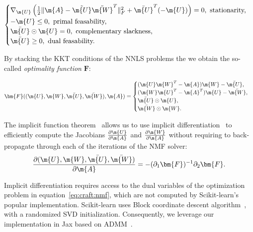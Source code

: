 \begin{equation} %
    \begin{cases}
    \nabla_{\m{U}}\left(\frac{1}{2}\|\m{A}-\tilde{\m{U}} \tilde{\m{W}}^T\|^2_F+\bar{\m{U}}^T(-\m{U})\right)    =0, \text{ stationarity,}\\
    -\m{U}\leq 0, \text{ primal feasability,}\\
    \bar{\m{U}} \odot \m{U}   =0, \text{ complementary slackness,}\\
    \bar{\m{U}}   \geq 0, \text{ dual feasability.}\\
\end{cases}
\label{apeq:craft:optimality_fun}
\end{equation}

By stacking the KKT conditions of the NNLS problems the we obtain the so-called \textit{optimality function} $\bm{F}$:

\begin{equation} %
    \bm{F}((\m{U},\m{W},\bar{\m{U}},\bar{\m{W}}),\m{A})=\begin{cases}
    (\m{U}\m{W}^T-\m{A})\m{W}-\bar{\m{U}}    ,& \\ %
    (\m{W}\m{U}^T-\m{A}^T)\m{U}-\bar{\m{W}}  ,& \\ %
    \bar{\m{U}} \odot \m{U}   ,& \\ %
    \bar{\m{W}} \odot \m{W}   .& \\ %
\end{cases}
\label{eq:craft:optimality_fun_2}
\end{equation}

The implicit function theorem~\cite{griewank2008evaluating} allows us to use implicit differentiation~\cite{krantz2002implicit,griewank2008evaluating,bell2008algorithmic} to efficiently compute the Jacobians $\frac{\partial \m{U}}{\partial \m{A}}$ and $\frac{\partial \m{W}}{\partial \m{A}}$ without requiring to back-propagate through each of the iterations of the NMF solver:
\begin{equation}
    \frac{\partial (\m{U},\m{W},\bar{\m{U}},\bar{\m{W}})}{\partial \m{A}}=-(\partial_1 \bm{F})^{-1}\partial_2 \bm{F}.
\end{equation}

Implicit differentiation requires access to the dual variables of the optimization problem in equation~\ref{eq:craft:nmf}, which are not computed by Scikit-learn's popular implementation. Scikit-learn uses Block coordinate descent algorithm~\cite{cichocki2009fast,fevotte2011algorithms}, with a randomized SVD initialization. Consequently, we leverage our implementation in Jax based on ADMM~\cite{boyd2011distributed}.

